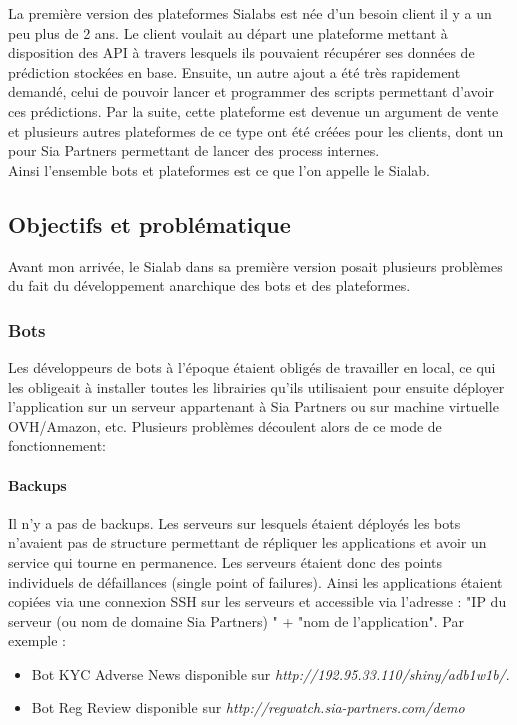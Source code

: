 \documentclass{article} %
\begin{document}
La première version des plateformes Sialabs est née d'un besoin client il y a un peu plus de 2 ans. Le client voulait au départ une plateforme mettant à disposition des API à travers lesquels ils pouvaient récupérer ses données de prédiction stockées en base. Ensuite, un autre ajout a été très rapidement demandé, celui de pouvoir lancer et programmer des scripts permettant d'avoir ces prédictions. Par la suite, cette plateforme est devenue un argument de vente et plusieurs autres plateformes de ce type ont été créées pour les clients, dont un pour Sia Partners permettant de lancer des process internes.\\

Ainsi l'ensemble bots et plateformes est ce que l'on appelle le Sialab. 

\subsection{Objectifs et problématique}
Avant mon arrivée, le Sialab dans sa première version posait plusieurs problèmes du fait du développement anarchique des bots et des plateformes.

\subsubsection{Bots\\}
Les développeurs de bots à l'époque étaient obligés de travailler en local, ce qui les obligeait à installer toutes les librairies qu'ils utilisaient pour ensuite déployer l'application sur un serveur appartenant à Sia Partners ou sur machine virtuelle OVH/Amazon, etc. Plusieurs problèmes découlent alors de ce mode de fonctionnement:

\paragraph{Backups}
Il n'y a pas de backups. Les serveurs sur lesquels étaient déployés les bots n'avaient pas de structure permettant de répliquer les applications et avoir un service qui tourne en permanence. Les serveurs étaient donc des points individuels de défaillances (single point of failures). Ainsi les applications étaient copiées via une connexion SSH sur les serveurs et accessible via l'adresse : "IP du serveur (ou nom de domaine Sia Partners) " + "nom de l'application". Par exemple : 
\begin{itemize}
 \item Bot KYC Adverse News disponible sur \textit{http://192.95.33.110/shiny/adb1w1b/}.
 \item Bot Reg Review disponible sur \textit{http://regwatch.sia-partners.com/demo}
\end{itemize}
\end{document}
